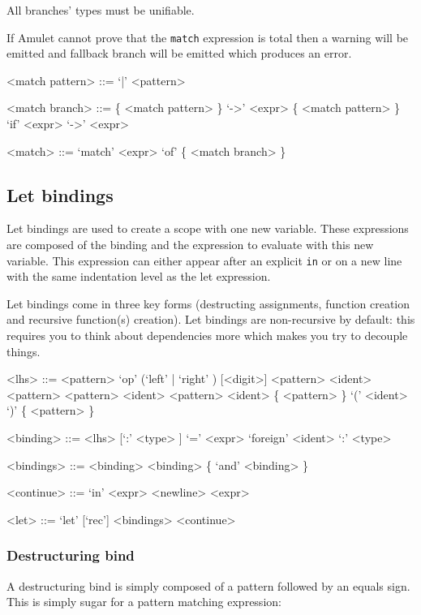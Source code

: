 All branches’ types must be unifiable.

If Amulet cannot prove that the \texttt{match} expression is total then a warning will be emitted and fallback branch will be emitted which produces an error.

\begin{grammar}
<match pattern> ::= `|' <pattern>

<match branch>  ::= \{ <match pattern> \} `->' <expr>
              \alt \{ <match pattern> \} `if' <expr> `->' <expr>

<match>         ::= `match' <expr> `of' \{ <match branch> \}
\end{grammar}

\subsection{Let bindings}
Let bindings are used to create a scope with one new variable. These expressions are composed of the binding and the expression to evaluate with this new variable. This expression can either appear after an explicit \texttt{in} or on a new line with the same indentation level as the let expression.

Let bindings come in three key forms (destructing assignments, function creation and recursive function(s) creation). Let bindings are non-recursive by default: this requires you to think about dependencies more which makes you try to decouple things.

\begin{grammar}
<lhs>      ::= <pattern>
          \alt `op' (`left' | `right' ) [<digit>] <pattern> <ident> <pattern>
          \alt <pattern> \lit{\`{}} <ident> \lit{\`{}} <pattern>
          \alt <ident> \{ <pattern> \}
          \alt `(' <ident> `)' \{ <pattern> \}

<binding>  ::= <lhs> [`:' <type> ] `=' <expr>
          \alt `foreign' <ident> `:' <type>

<bindings> ::= <binding>
          \alt <binding> \{ `and' <binding> \}

<continue> ::= `in' <expr>
          \alt <newline> <expr>

<let>      ::= `let' [`rec'] <bindings> <continue>
\end{grammar}

\subsubsection{Destructuring bind}
A destructuring bind is simply composed of a pattern followed by an equals sign. This is simply sugar for a pattern matching expression:


